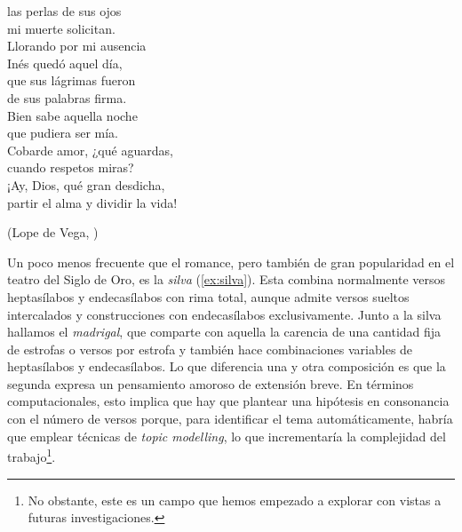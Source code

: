 \begin{exe}
\begin{multicols}{2}
	las perlas de sus ojos\\
	mi muerte solicitan.\\
	Llorando por mi ausencia\\
	Inés quedó aquel día,\\
	que sus lágrimas fueron\\
	de sus palabras firma.\\
	Bien sabe aquella noche\\
	que pudiera ser mía.\\
	Cobarde amor, ¿qué aguardas,\\
	cuando respetos miras?\\
	¡Ay, Dios, qué gran desdicha,\\
	partir el alma y dividir la vida!\end{multicols} 
	\strut\hfill(Lope de Vega, )
\end{exe}

Un poco menos frecuente que el romance, pero también de gran popularidad en el teatro del Siglo de Oro, es la \textit{silva} (\ref{ex:silva}). Esta combina normalmente versos heptasílabos y endecasílabos con rima total, aunque admite versos sueltos intercalados y construcciones con endecasílabos exclusivamente. Junto a la silva hallamos el \textit{madrigal}, que comparte con aquella la carencia de una cantidad fija de estrofas o versos por estrofa y también hace combinaciones variables de heptasílabos y endecasílabos. Lo que diferencia una y otra composición es que la segunda expresa un pensamiento amoroso de extensión breve. En términos computacionales, esto implica que hay que plantear una hipótesis en consonancia con el número de versos porque, para identificar el tema automáticamente, habría que emplear técnicas de \textit{topic modelling}, lo que incrementaría la complejidad del trabajo\footnote{No obstante, este es un campo que hemos empezado a explorar con vistas a futuras investigaciones.}. 

